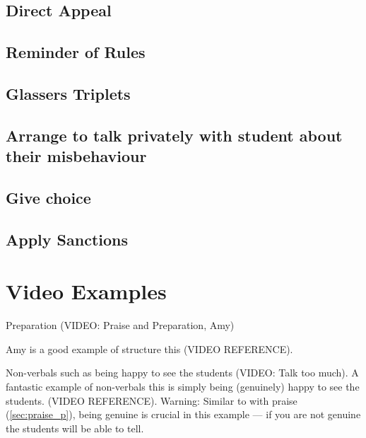 \documentclass[12pt]{report}
\begin{document}
\section{Direct Appeal}

\section{Reminder of Rules}

\section{Glassers Triplets}



\section{Arrange to talk privately with student about their misbehaviour}
\label{sec:private_talk_c}

\section{Give choice}
\label{sec:give choice_c}

\section{Apply Sanctions}
\label{sec:sanctions_c}
















\chapter{Video Examples}
\label{chap:video_examples}

Preparation (VIDEO: Praise and Preparation, Amy)

 Amy is a good example of structure this (VIDEO REFERENCE).

Non-verbals such as being happy to see the students (VIDEO: Talk too much).
A fantastic example of non-verbals this is simply being (genuinely) happy to see the students.
(VIDEO REFERENCE). Warning: Similar to with praise (\ref{sec:praise_p}), being genuine is crucial in this example --- if you are not genuine the students will be able to tell.
\end{document}
